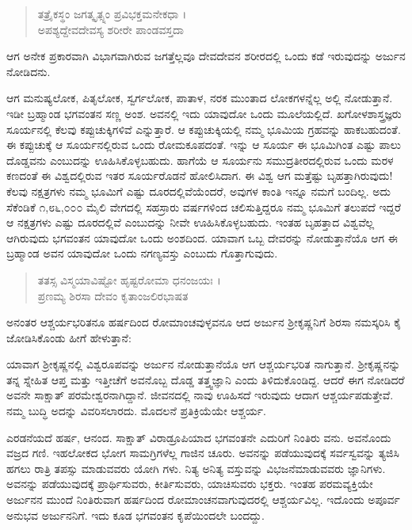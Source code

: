 \begin{verse}
ತತ್ರೈಕಸ್ಥಂ ಜಗತ್ಕೃತ್ಸ್ನಂ ಪ್ರವಿಭಕ್ತಮನೇಕಧಾ ।\\ಅಪಶ್ಯದ್ದೇವದೇವಸ್ಯ ಶರೀರೇ ಪಾಂಡವಸ್ತದಾ 
\end{verse}

{\small ಆಗ ಅನೇಕ ಪ್ರಕಾರವಾಗಿ ವಿಭಾಗವಾಗಿರುವ ಜಗತ್ತೆಲ್ಲವೂ ದೇವದೇವನ ಶರೀರದಲ್ಲಿ ಒಂದು ಕಡೆ ಇರುವುದನ್ನು ಅರ್ಜುನ ನೋಡಿದನು.}

ಆಗ ಮನುಷ್ಯಲೋಕ, ಪಿತೃಲೋಕ, ಸ್ವರ್ಗಲೋಕ, ಪಾತಾಳ, ನರಕ ಮುಂತಾದ ಲೋಕಗಳನ್ನೆಲ್ಲ ಅಲ್ಲಿ ನೋಡುತ್ತಾನೆ. ಇಡೀ ಬ್ರಹ್ಮಾಂಡ ಭಗವಂತನ ಸಣ್ಣ ಅಂಶ. ಅವನಲ್ಲಿ ಇದು ಯಾವುದೋ ಒಂದು ಮೂಲೆಯಲ್ಲಿದೆ. ಖಗೋಳಶಾಸ್ತ್ರಜ್ಞರು ಸೂರ್ಯನಲ್ಲಿ ಕೆಲವು ಕಪ್ಪುಚುಕ್ಕಿಗಳಿವೆ ಎನ್ನುತ್ತಾರೆ. ಆ ಕಪ್ಪುಚುಕ್ಕಿಯಲ್ಲಿ ನಮ್ಮ ಭೂಮಿಯ ಗ್ರಹವನ್ನು ಹಾಕಬಹುದಂತೆ. ಈ ಕಪ್ಪುಚುಕ್ಕೆ ಆ ಸೂರ್ಯನಲ್ಲಿರುವ ಒಂದು ರೋಮಕೂಪದಂತೆ. ಇನ್ನು ಆ ಸೂರ್ಯ ಈ ಭೂಮಿಗಿಂತ ಎಷ್ಟು ಪಾಲು ದೊಡ್ಡವನು ಎಂಬುದನ್ನು ಊಹಿಸಿಕೊಳ್ಳಬಹುದು. ಹಾಗೆಯೆ ಆ ಸೂರ್ಯನು ಸಮುದ್ರತೀರದಲ್ಲಿರುವ ಒಂದು ಮರಳ ಕಣದಂತೆ ಈ ವಿಶ್ವದಲ್ಲಿರುವ ಇತರ ಸೂರ್ಯರೊಡನೆ ಹೋಲಿಸಿದಾಗ. ಈ ವಿಶ್ವ ಆಗ ಮತ್ತೆಷ್ಟು ಬೃಹತ್ತಾಗಿರುವುದು! ಕೆಲವು ನಕ್ಷತ್ರಗಳು ನಮ್ಮ ಭೂಮಿಗೆ ಎಷ್ಟು ದೂರದಲ್ಲಿವೆಯೆಂದರೆ, ಅವುಗಳ ಕಾಂತಿ ಇನ್ನೂ ನಮಗೆ ಬಂದಿಲ್ಲ. ಅದು ಸೆಕೆಂಡಿಕೆ ೧,೮೬,೦೦೦ ಮೈಲಿ ವೇಗದಲ್ಲಿ ಸಹಸ್ರಾರು ವರ್ಷಗಳಿಂದ ಚಲಿಸುತ್ತಿದ್ದರೂ ನಮ್ಮ ಭೂಮಿಗೆ ತಲುಪದೆ ಇದ್ದರೆ ಆ ನಕ್ಷತ್ರಗಳು ಎಷ್ಟು ದೂರದಲ್ಲಿವೆ ಎಂಬುದನ್ನು ನೀವೇ ಊಹಿಸಿಕೊಳ್ಳಬಹುದು. ಇಂತಹ ಬೃಹತ್ತಾದ ವಿಶ್ವವೆಲ್ಲ ಆಗಿರುವುದು ಭಗವಂತನ ಯಾವುದೋ ಒಂದು ಅಂಶದಿಂದ. ಯಾವಾಗ ಒಬ್ಬ ದೇವರನ್ನು ನೋಡುತ್ತಾನೆಯೊ ಆಗ ಈ ಬ್ರಹ್ಮಾಂಡ ಅವನ ಯಾವುದೋ ಒಂದು ನಗಣ್ಯವಸ್ತು ಎಂಬುದು ಗೊತ್ತಾಗುವುದು.

\begin{verse}
ತತಸ್ಸ ವಿಸ್ಮಯಾವಿಷ್ಟೋ ಹೃಷ್ಟರೋಮಾ ಧನಂಜಯಃ ।\\ಪ್ರಣಮ್ಯ ಶಿರಸಾ ದೇವಂ ಕೃತಾಂಜಲಿರಭಾಷತ 
\end{verse}

{\small ಅನಂತರ ಆಶ್ಚರ್ಯಭರಿತನೂ ಹರ್ಷದಿಂದ ರೋಮಾಂಚವುಳ್ಳವನೂ ಆದ ಅರ್ಜುನ ಶ್ರೀಕೃಷ್ಣನಿಗೆ ಶಿರಸಾ ನಮಸ್ಕರಿಸಿ ಕೈ ಜೋಡಿಸಿಕೊಂಡು ಹೀಗೆ ಹೇಳುತ್ತಾನೆ:}

ಯಾವಾಗ ಶ್ರೀಕೃಷ್ಣನಲ್ಲಿ ವಿಶ್ವರೂಪವನ್ನು ಅರ್ಜುನ ನೋಡುತ್ತಾನೆಯೊ ಆಗ ಆಶ್ಚರ್ಯಭರಿತ ನಾಗುತ್ತಾನೆ. ಶ್ರೀಕೃಷ್ಣನನ್ನು ತನ್ನ ಸ್ನೇಹಿತ ಆಪ್ತ ಮತ್ತು ಇತ್ತೀಚೆಗೆ ಅವನೊಬ್ಬ ದೊಡ್ಡ ತತ್ತ್ವಜ್ಞಾನಿ ಎಂದು ತಿಳಿದುಕೊಂಡಿದ್ದ. ಆದರೆ ಈಗ ನೋಡಿದರೆ ಅವನೇ ಸಾಕ್ಷಾತ್ ಪರಮೇಶ್ವರನಾಗಿದ್ದಾನೆ. ಜೀವನದಲ್ಲಿ ನಾವು ಊಹಿಸದೆ ಇರುವುದು ಆದಾಗ ಆಶ್ಚರ್ಯಪಡುತ್ತೇವೆ. ನಮ್ಮ ಬುದ್ಧಿ ಅದನ್ನು ವಿವರಿಸಲಾರದು. ಮೊದಲನೆ ಪ್ರತಿಕ್ರಿಯೆಯೇ ಆಶ್ಚರ್ಯ.

ಎರಡನೆಯದೆ ಹರ್ಷ, ಆನಂದ. ಸಾಕ್ಷಾತ್ ವಿರಾಡ್ರೂಪಿಯಾದ ಭಗವಂತನೇ ಎದುರಿಗೆ ನಿಂತಿರು ವನು. ಅವನೊಂದು ವಜ್ರದ ಗಣಿ. ಇಹಲೋಕದ ಭೋಗ ಸಾಮಗ್ರಿಗಳೆಲ್ಲ ಗಾಜಿನ ಚೂರು. ಅವನನ್ನು ಪಡೆಯುವುದಕ್ಕೆ ಸರ್ವಸ್ವವನ್ನು ತ್ಯಜಿಸಿ ಹಗಲು ರಾತ್ರಿ ತಪಸ್ಸು ಮಾಡುವವರು ಯೋಗಿ ಗಳು. ನಿತ್ಯ ಅನಿತ್ಯ ವಸ್ತುವನ್ನು ವಿಭಜನೆಮಾಡುವವರು ಜ್ಞಾನಿಗಳು. ಅವನನ್ನು ಪಡೆಯುವುದಕ್ಕೆ ಪ್ರಾರ್ಥಿಸುವರು, ಕೀರ್ತಿಸುವರು, ಯಾಚಿಸುವರು ಭಕ್ತರು. ಇಂತಹ ಪರಮವ್ಯಕ್ತಿಯೇ ಅರ್ಜುನನ ಮುಂದೆ ನಿಂತಿರುವಾಗ ಹರ್ಷದಿಂದ ರೋಮಾಂಚನವಾಗುವುದರಲ್ಲಿ ಆಶ್ಚರ್ಯವಿಲ್ಲ. ಇದೊಂದು ಅಪೂರ್ವ ಅನುಭವ ಅರ್ಜುನನಿಗೆ. ಇದು ಕೂಡ ಭಗವಂತನ ಕೃಪೆಯಿಂದಲೇ ಬಂದದ್ದು.

